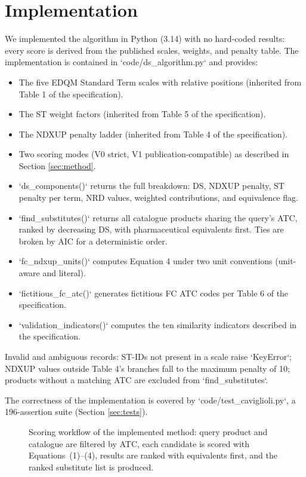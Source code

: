 \documentclass[a4paper]{elsarticle}
\begin{document}
\section{Implementation}
\label{sec:implementation}

We implemented the algorithm in Python (3.14) with no hard-coded results: every score is derived from the published scales, weights, and penalty table. The implementation is contained in `code/ds\_algorithm.py` and provides:

\begin{itemize}
\item The five EDQM Standard Term scales with relative positions (inherited from Table 1 of the specification).
\item The ST weight factors (inherited from Table 5 of the specification).
\item The NDXUP penalty ladder (inherited from Table 4 of the specification).
\item Two scoring modes (V0 strict, V1 publication-compatible) as described in Section \ref{sec:method}.
\item `ds\_components()` returns the full breakdown: DS, NDXUP penalty, ST penalty per term, NRD values, weighted contributions, and equivalence flag.
\item `find\_substitutes()` returns all catalogue products sharing the query's ATC, ranked by decreasing DS, with pharmaceutical equivalents first. Ties are broken by AIC for a deterministic order.
\item `fc\_ndxup\_units()` computes Equation 4 under two unit conventions (unit-aware and literal).
\item `fictitious\_fc\_atc()` generates fictitious FC ATC codes per Table 6 of the specification.
\item `validation\_indicators()` computes the ten similarity indicators described in the specification.
\end{itemize}

Invalid and ambiguous records: ST-IDs not present in a scale raise `KeyError`; NDXUP values outside Table 4's branches fall to the maximum penalty of 10; products without a matching ATC are excluded from `find\_substitutes`.

The correctness of the implementation is covered by `code/test\_caviglioli.py`, a 196-assertion suite (Section \ref{sec:tests}).

\begin{figure}[htbp]
\centering
\resizebox{\columnwidth}{!}{%
%
}
\caption{Scoring workflow of the implemented method: query product and catalogue are filtered by ATC, each candidate is scored with Equations~(1)--(4), results are ranked with equivalents first, and the ranked substitute list is produced.}
\label{fig:workflow}
\end{figure}
\end{document}
